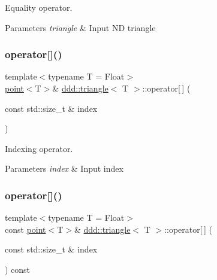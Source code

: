 Equality operator. 


\begin{DoxyParams}{Parameters}
{\em triangle} & Input ND triangle \\
\hline
\end{DoxyParams}
\mbox{\label{classddd_1_1triangle_afa3078cf85103598c7967644de4d2dc1}} 
\subsubsection{\texorpdfstring{operator[]()}{operator[]()}\hspace{0.1cm}{\footnotesize\ttfamily [1/2]}}
{\footnotesize\ttfamily template$<$typename T = Float$>$ \\
\hyperlink{classddd_1_1point}{point}$<$T$>$\& \hyperlink{classddd_1_1triangle}{ddd\+::triangle}$<$ T $>$\+::operator\mbox{[}$\,$\mbox{]} (\begin{DoxyParamCaption}\item[{const std\+::size\+\_\+t \&}]{index }\end{DoxyParamCaption})\hspace{0.3cm}{\ttfamily [inline]}}



Indexing operator. 


\begin{DoxyParams}{Parameters}
{\em index} & Input index \\
\hline
\end{DoxyParams}
\mbox{\label{classddd_1_1triangle_aad15ef95a744f9177a0424c3c27afe72}} 
\subsubsection{\texorpdfstring{operator[]()}{operator[]()}\hspace{0.1cm}{\footnotesize\ttfamily [2/2]}}
{\footnotesize\ttfamily template$<$typename T = Float$>$ \\
const \hyperlink{classddd_1_1point}{point}$<$T$>$\& \hyperlink{classddd_1_1triangle}{ddd\+::triangle}$<$ T $>$\+::operator\mbox{[}$\,$\mbox{]} (\begin{DoxyParamCaption}\item[{const std\+::size\+\_\+t \&}]{index }\end{DoxyParamCaption}) const\hspace{0.3cm}{\ttfamily [inline]}}



